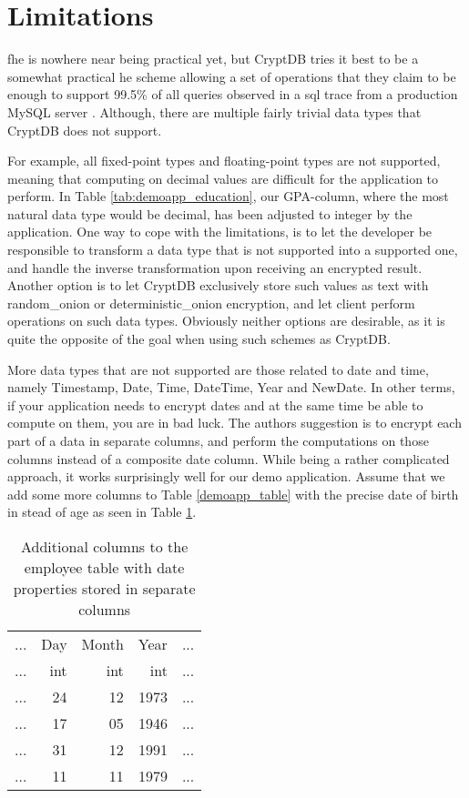 \section{Limitations}
\label{sec:limits}

\gls{fhe} is nowhere near being practical yet, but CryptDB tries it best to be a somewhat practical \gls{he} scheme allowing a set of operations that they claim to be enough to support 99.5\% of all queries observed in a \gls{sql} trace from a production MySQL server \citep{CryptDB_Main_Paper}. Although, there are multiple fairly trivial data types that CryptDB does not support.

For example, all fixed-point types and floating-point types are not supported, meaning that computing on decimal values are difficult for the application to perform. In Table \ref{tab:demoapp_education}, our GPA-column, where the most natural data type would be decimal, has been adjusted to integer by the application. One way to cope with the limitations, is to let the developer be responsible to transform a data type that is not supported into a supported one, and handle the inverse transformation  upon receiving an encrypted result. Another option is to let CryptDB exclusively store such values as text with \gls{random_onion} or \gls{deterministic_onion} encryption, and let client perform operations on such data types. Obviously neither options are desirable, as it is quite the opposite of the goal when using such schemes as CryptDB. 

More data types that are not supported are those related to date and time, namely Timestamp, Date, Time, DateTime, Year and NewDate. In other terms, if your application needs to encrypt dates and at the same time be able to compute on them, you are in bad luck. The authors suggestion is to encrypt each part of a data in separate columns, and perform the computations on those columns instead of a composite date column. While being a rather complicated approach, it works surprisingly well for our demo application. Assume that we add some more columns to Table \ref{demoapp_table} with the precise date of birth in stead of age as seen in Table \ref{tab:empl_tab_mod}.

\begin{table}[H]
\label{tab:empl_tab_mod}
\centering
\begin{tabular}{| c | r | r | r | c |}
\hline
  ... & Day & Month & Year & ... \\
  ... & int & int & int & ... \\
 \hline \hline
 ... & 24 & 12 & 1973  & ... \\
 ... & 17 & 05 & 1946 & ... \\
 ... & 31 & 12 & 1991 & ... \\
 ... & 11 & 11 & 1979  & ... \\
 \hline

\end{tabular}
\caption{Additional columns to the employee table with date properties stored in separate columns}
\end{table}

